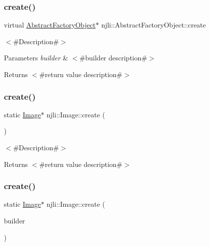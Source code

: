 \subsubsection{\texorpdfstring{create()}{create()}\hspace{0.1cm}{\footnotesize\ttfamily [1/3]}}
{\footnotesize\ttfamily virtual \mbox{\hyperlink{classnjli_1_1_abstract_factory_object}{Abstract\+Factory\+Object}}$\ast$ njli\+::\+Abstract\+Factory\+Object\+::create}

$<$\#\+Description\#$>$


\begin{DoxyParams}{Parameters}
{\em builder} & $<$\#builder description\#$>$\\
\hline
\end{DoxyParams}
\begin{DoxyReturn}{Returns}
$<$\#return value description\#$>$ 
\end{DoxyReturn}
\mbox{\label{classnjli_1_1_image_af5df1abd1524c9c941be7f6d3f59e78b}} 
\subsubsection{\texorpdfstring{create()}{create()}\hspace{0.1cm}{\footnotesize\ttfamily [2/3]}}
{\footnotesize\ttfamily static \mbox{\hyperlink{classnjli_1_1_image}{Image}}$\ast$ njli\+::\+Image\+::create (\begin{DoxyParamCaption}{ }\end{DoxyParamCaption})\hspace{0.3cm}{\ttfamily [static]}}

$<$\#\+Description\#$>$

\begin{DoxyReturn}{Returns}
$<$\#return value description\#$>$ 
\end{DoxyReturn}
\mbox{\label{classnjli_1_1_image_a610e5319fd868f5a42d3bfcc6a7b80b6}} 
\subsubsection{\texorpdfstring{create()}{create()}\hspace{0.1cm}{\footnotesize\ttfamily [3/3]}}
{\footnotesize\ttfamily static \mbox{\hyperlink{classnjli_1_1_image}{Image}}$\ast$ njli\+::\+Image\+::create (\begin{DoxyParamCaption}\item[{const \mbox{\hyperlink{classnjli_1_1_image_builder}{Image\+Builder}} \&}]{builder }\end{DoxyParamCaption})\hspace{0.3cm}{\ttfamily [static]}}

